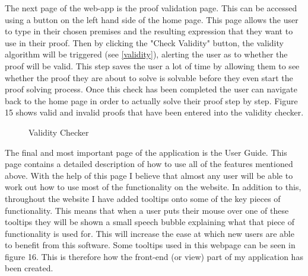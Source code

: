 The next page of the web-app is the proof validation page. This can be accessed using a button on the left hand side of the home page. This page allows the user to type in their chosen premises and the resulting expression that they want to use in their proof. Then by clicking the "Check Validity" button, the validity algorithm will be triggered (see \ref{validity}), alerting the user as to whether the proof will be valid. This step saves the user a lot of time by allowing them to see whether the proof they are about to solve is solvable before they even start the proof solving process. Once this check has been completed the user can navigate back to the home page in order to actually solve their proof step by step. Figure 15 shows valid and invalid proofs that have been entered into the validity checker.

\begin{figure}[!ht]
	\centering
	\caption{Validity Checker}
\end{figure}
\pagebreak

The final and most important page of the application is the User Guide. This page contains a detailed description of how to use all of the features mentioned above. With the help of this page I believe that almost any user will be able to work out how to use most of the functionality on the website. In addition to this, throughout the website I have added tooltips onto some of the key pieces of functionality. This means that when a user puts their mouse over one of these tooltips they will be shown a small speech bubble explaining what that piece of functionality is used for. This will increase the ease at which new users are able to benefit from this software. Some tooltips used in this webpage can be seen in figure 16. This is therefore how the front-end (or view) part of my application has been created.

